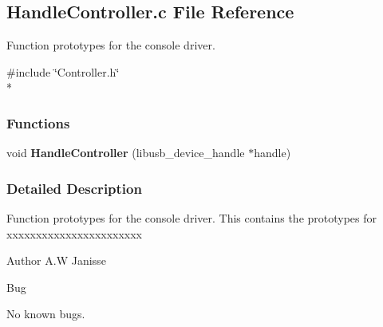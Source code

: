\subsection{Handle\-Controller.\-c File Reference}
\label{_handle_controller_8c}


Function prototypes for the console driver.  


{\ttfamily \#include \char`\"{}Controller.\-h\char`\"{}}\\*
\subsubsection*{Functions}
\begin{DoxyCompactItemize}
\item 
void {\bfseries Handle\-Controller} (libusb\-\_\-device\-\_\-handle $\ast$handle)\label{_handle_controller_8c_ae75a18b65c6212d966c24396232cf2a6}

\end{DoxyCompactItemize}


\subsubsection{Detailed Description}
Function prototypes for the console driver. This contains the prototypes for xxxxxxxxxxxxxxxxxxxxxxx

\begin{DoxyAuthor}{Author}
A.\-W Janisse 
\end{DoxyAuthor}
\begin{DoxyRefDesc}{Bug}
\item[{\bf Bug}]No known bugs. \end{DoxyRefDesc}
